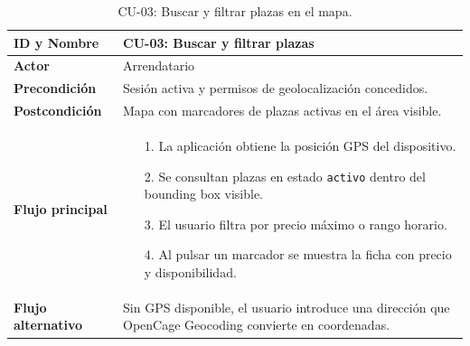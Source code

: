 \begin{table}[H]
  \centering
  \caption{CU-03: Buscar y filtrar plazas en el mapa.}
  \label{tab:cu-03}
  \begin{tabularx}{\textwidth}{|>{\columncolor{gray!15}\bfseries}l|X|}
    \hline
    ID y Nombre       & CU-03: Buscar y filtrar plazas                                                                          \\ \hline
    Actor             & Arrendatario                                                                                            \\ \hline
    Precondición      & Sesión activa y permisos de geolocalización concedidos.                                                 \\ \hline
    Postcondición     & Mapa con marcadores de plazas activas en el área visible.                                               \\ \hline
    Flujo principal   &
    \begin{itemize}[leftmargin=3mm, itemsep=0mm, topsep=1mm]
      \item[1.] La aplicación obtiene la posición GPS del dispositivo.
      \item[2.] Se consultan plazas en estado \texttt{activo} dentro del bounding box visible.
      \item[3.] El usuario filtra por precio máximo o rango horario.
      \item[4.] Al pulsar un marcador se muestra la ficha con precio y disponibilidad.
    \end{itemize}                                     \\ \hline
    Flujo alternativo & Sin GPS disponible, el usuario introduce una dirección que OpenCage Geocoding convierte en coordenadas. \\ \hline
  \end{tabularx}
\end{table}

